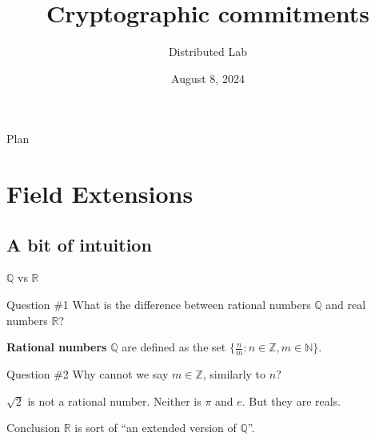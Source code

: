 \documentclass{beamer}
\title[Cryptographic commitments]{\textbf{Cryptographic commitments}}
\author{Distributed Lab}
\date{August 8, 2024}
\begin{document}
    \frame {
      \titlepage
    }
  
    \begin{frame}{Plan}
      \tableofcontents
    \end{frame}

    \section{Field Extensions}

    \subsection{A bit of intuition}

    \begin{frame}{$\mathbb{Q}$ vs $\mathbb{R}$}
        \begin{alertblock}{Question \#1}
            What is the difference between rational numbers $\mathbb{Q}$ and real numbers $\mathbb{R}$?
        \end{alertblock}

        \begin{definition}
            \textbf{Rational numbers} $\mathbb{Q}$ are defined as the set $\{\frac{n}{m}: n \in \mathbb{Z}, m \in \mathbb{N}\}$.
        \end{definition}

        \begin{alertblock}{Question \#2}
            Why cannot we say $m \in \mathbb{Z}$, similarly to $n$?
        \end{alertblock}

        \begin{theorem}
            $\sqrt{2}$ is not a rational number. Neither is $\pi$ and $e$. But they are reals.
        \end{theorem}

        \begin{block}{Conclusion}
            $\mathbb{R}$ is sort of ``an extended version of $\mathbb{Q}$''.
        \end{block}
    \end{frame}
\end{document}
